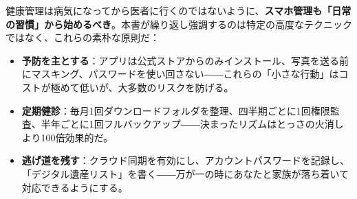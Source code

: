 
健康管理は病気になってから医者に行くのではないように、\textbf{スマホ管理も「日常の習慣」から始めるべき}。本書が繰り返し強調するのは特定の高度なテクニックではなく、これらの素朴な原則だ：

\begin{itemize}
  \item \textbf{予防を主とする}：アプリは公式ストアからのみインストール、写真を送る前にマスキング、パスワードを使い回さない――これらの「小さな行動」はコストが極めて低いが、大多数のリスクを防げる。
  \item \textbf{定期健診}：毎月1回ダウンロードフォルダを整理、四半期ごとに1回権限監査、半年ごとに1回フルバックアップ――決まったリズムはとっさの火消しより100倍効果的だ。
  \item \textbf{逃げ道を残す}：クラウド同期を有効にし、アカウントパスワードを記録し、「デジタル遺産リスト」を書く――万が一の時にあなたと家族が落ち着いて対応できるようにする。
\end{itemize}
